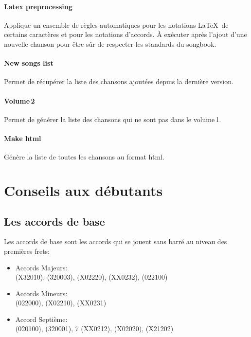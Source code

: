 \documentclass[versionenligne]{patacrep}
\begin{document}
\paragraph{Latex preprocessing}
Applique un ensemble de règles automatiques pour les notations \LaTeX\,
de certains caractères et pour les notations d'accords.
À exécuter après l'ajout d'une nouvelle chanson pour être sûr de
respecter les standards du songbook.

\paragraph{New songs list}
Permet de récupérer la liste des chansons ajoutées depuis la dernière
version.

\paragraph{Volume\,2}
Permet de générer la liste des chansons qui ne sont pas dans le volume\,1.

\paragraph{Make html}
Génère la liste de toutes les chansons au format html.


\section{Conseils aux débutants}

\subsection{Les accords de base}

Les accords de base sont les accords qui se jouent sans barré au
niveau des premières frets:

\begin{itemize}
\item Accords Majeurs:\\  (X32010), 
  (320003),  (X02220),  (XX0232), 
  (022100)\\
\item Accords Mineurs:\\
   (022000),  (X02210),  (XX0231)\\
\item Accord Septième:\\  (020100), 
  (320001), 7 (XX0212),  (X02020),
   (X21202)\\
\end{itemize}
\end{document}
